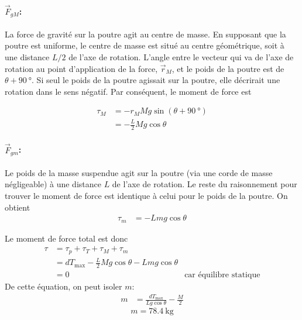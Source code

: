 \documentclass{tufte-handout}
\begin{document}
\paragraph{$\vec{F}_{gM}$:}
La force de gravité sur la poutre agit au centre de masse.  En supposant que la
poutre est uniforme, le centre de masse est situé au centre géométrique, soit à
une distance $L/2$ de l'axe de rotation.  L'angle entre le vecteur qui va de
l'axe de rotation au point d'application de la force, $\vec{r}_M$, et le poids
de la poutre est de $\theta + \SI{90}{\degree}$.  Si seul le poids de la
poutre agissait sur la poutre, elle décrirait une rotation dans le sens
négatif.  Par conséquent, le moment de force est
\begin{marginfigure}
  \begin{center}
  \end{center}
\end{marginfigure}
\begin{align*}
  \tau_M &= -r_M Mg \sin (\theta + \SI{90}{\degree}) \\
         &= - \frac{L}{2} Mg \cos\theta
\end{align*}


\paragraph{$\vec{F}_{gm}$:}
Le poids de la masse suspendue agit sur la
poutre (via une corde de masse négligeable) à une distance $L$ de l'axe de
rotation.  Le reste du raisonnement pour trouver le moment de force est
identique à celui pour le poids de la poutre.  On obtient
\begin{align*}
  \tau_m &= - L mg \cos\theta
\end{align*}


Le moment de force total est donc
\begin{align*}
  \tau &= \tau_p + \tau_T + \tau_M + \tau_m \\
       &= dT_\mathrm{max} - \frac{L}{2} Mg \cos\theta - Lmg\cos\theta \\
       &= 0 & \text{car équilibre statique}
\end{align*}
De cette équation, on peut isoler $m$:
\begin{align*}
  m &= \frac{dT_\mathrm{max}}{Lg\cos\theta} - \frac{M}{2}
\end{align*}
\begin{equation*}
  \boxed{m = \SI{78.4}{\kilogram}}
\end{equation*}
\end{document}

